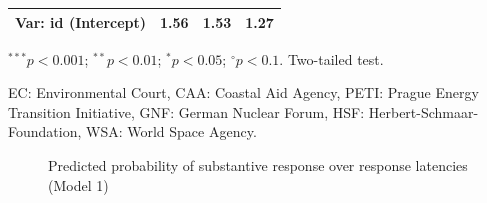 \documentclass[Royal,times,sageh]{sagej}
\begin{document}
\begin{table}
\begin{center}
\begin{small}
\begin{threeparttable}
\begin{tabular}{l D{)}{)}{9)3} D{)}{)}{9)5} D{)}{)}{9)5}}
Var: id (Intercept)            & 1.56                  & 1.53                   & 1.27                    \\
\bottomrule
\end{tabular}
\begin{tablenotes}[flushleft]
\tiny{\item $^{***}p<0.001$; $^{**}p<0.01$; $^{*}p<0.05$; 
                           $^{\circ}p<0.1$. Two-tailed test. 
                           \item EC: Environmental Court, CAA: Coastal Aid Agency, PETI: Prague Energy Transition Initiative, GNF: German Nuclear Forum, HSF: Herbert-Schmaar-Foundation, WSA: World Space Agency.}
\end{tablenotes}
\end{threeparttable}
\end{small}
\label{tab:results}
\end{center}
\end{table}

\begin{figure}
\caption{\label{fig:rl-plot}Predicted probability of substantive response over response latencies (Model 1)}\label{fig:unnamed-chunk-4}
\end{figure}
\end{document}
